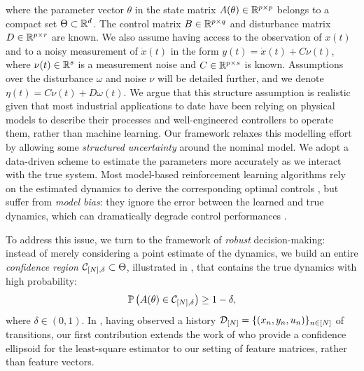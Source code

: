 \documentclass{article}
\begin{document}
where the parameter vector $\theta$ in the state matrix $A(\theta)\in\mathbb{R}^{p\times p}$ belongs to a compact set $\Theta \subset \mathbb{R}^d$. The control matrix $B\in\mathbb{R}^{p\times q}$ and disturbance matrix $D\in\mathbb{R}^{p\times r}$ are known. We also assume having access to the observation of $x(t)$ and to a noisy measurement of $\dot{x}(t)$ in the form $y(t)=\dot{x}(t) + C\nu(t)$, where $\nu(t)\in\mathbb{R}^s$ is a measurement noise and $C\in\mathbb{R}^{p\times s}$ is known. Assumptions over the disturbance $\omega$ and noise $\nu$ will be detailed further, and we denote $\eta(t) = C\nu(t) + D\omega(t)$. We argue that this structure assumption is realistic given that most industrial applications to date have been relying on physical models to describe their processes and well-engineered controllers to operate them, rather than machine learning. Our framework relaxes this modelling effort by allowing some \emph{structured uncertainty} around the nominal model. We adopt a data-driven scheme to estimate the parameters more accurately as we interact with the true system. Most model-based reinforcement learning algorithms rely on the estimated dynamics to derive the corresponding optimal controls \citep[e.g.][]{Lenz2015,Levine2015}, but suffer from \emph{model bias}: they ignore the error between the learned and true dynamics, which can dramatically degrade control performances \citep{Schneider1997}. %

To address this issue, we turn to the framework of \emph{robust} decision-making: instead of merely considering a point estimate of the dynamics, we build an entire \emph{confidence region} $\mathcal{C}_{[N],\delta} \subset \Theta$, illustrated in , that contains the true dynamics with high probability:
\begin{align}
\mathbb{P}\left(A(\theta)\in \mathcal{C}_{[N],\delta}\right) \geq 1-\delta,
\label{eq:confidence}
\end{align}
where $\delta\in(0,1)$. In , having observed a history $\mathcal{D}_{[N]} = \{(x_n, y_n,u_n)\}_{n\in[N]}$ of transitions, our first contribution extends the work of \citet{Abbasi2011} who provide a confidence ellipsoid for the least-square estimator to our setting of feature matrices, rather than feature vectors. 
\end{document}
